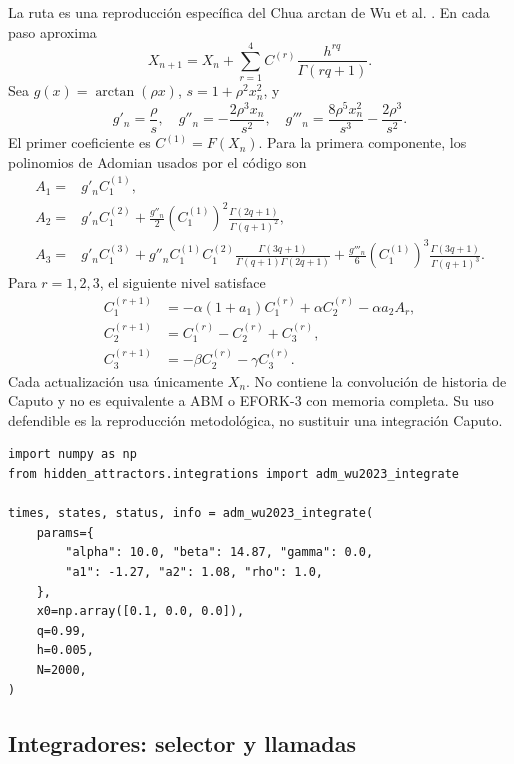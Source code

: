 La ruta  es una reproducción específica del
Chua arctan de Wu et al. \cite{Wu2023ArctanChua}. En cada paso aproxima
\[
 X_{n+1}=X_n+
 \sum_{r=1}^{4}C^{(r)}
 \frac{h^{rq}}{\Gamma(rq+1)}.
\]
Sea \(g(x)=\arctan(\rho x)\), \(s=1+\rho^2x_n^2\), y
\[
 g'_n=\frac{\rho}{s},\quad
 g''_n=-\frac{2\rho^3x_n}{s^2},\quad
 g'''_n=\frac{8\rho^5x_n^2}{s^3}-\frac{2\rho^3}{s^2}.
\]
El primer coeficiente es \(C^{(1)}=F(X_n)\). Para la primera componente, los
polinomios de Adomian usados por el código son
\[
\begin{aligned}
 A_1={}&g'_n C^{(1)}_1,\\
 A_2={}&g'_n C^{(2)}_1+
 \frac{g''_n}{2}(C^{(1)}_1)^2
 \frac{\Gamma(2q+1)}{\Gamma(q+1)^2},\\
 A_3={}&g'_n C^{(3)}_1+
 g''_nC^{(1)}_1C^{(2)}_1
 \frac{\Gamma(3q+1)}{\Gamma(q+1)\Gamma(2q+1)}
 +\frac{g'''_n}{6}(C^{(1)}_1)^3
 \frac{\Gamma(3q+1)}{\Gamma(q+1)^3}.
\end{aligned}
\]
Para \(r=1,2,3\), el siguiente nivel satisface
\[
\begin{aligned}
 C^{(r+1)}_1&=-\alpha(1+a_1)C^{(r)}_1
 +\alpha C^{(r)}_2-\alpha a_2 A_r,\\
 C^{(r+1)}_2&=C^{(r)}_1-C^{(r)}_2+C^{(r)}_3,\\
 C^{(r+1)}_3&=-\beta C^{(r)}_2-\gamma C^{(r)}_3.
\end{aligned}
\]
Cada actualización usa únicamente \(X_n\). No contiene la convolución de
historia de Caputo y no es equivalente a ABM o EFORK-3 con memoria completa.
Su uso defendible es la reproducción metodológica, no sustituir una
integración Caputo.

\begin{verbatim}
import numpy as np
from hidden_attractors.integrations import adm_wu2023_integrate

times, states, status, info = adm_wu2023_integrate(
    params={
        "alpha": 10.0, "beta": 14.87, "gamma": 0.0,
        "a1": -1.27, "a2": 1.08, "rho": 1.0,
    },
    x0=np.array([0.1, 0.0, 0.0]),
    q=0.99,
    h=0.005,
    N=2000,
)
\end{verbatim}

\subsection{Integradores: selector y llamadas}

